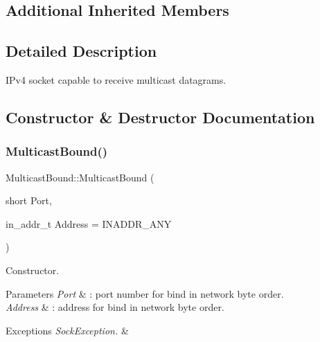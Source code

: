 \subsection*{Additional Inherited Members}


\subsection{Detailed Description}
I\+Pv4 socket capable to receive multicast datagrams. 

\subsection{Constructor \& Destructor Documentation}
\mbox{\label{classMulticastBound_aed105f983bf0ec03ddea66770e2622e7}} 
\subsubsection{\texorpdfstring{Multicast\+Bound()}{MulticastBound()}\hspace{0.1cm}{\footnotesize\ttfamily [1/3]}}
{\footnotesize\ttfamily Multicast\+Bound\+::\+Multicast\+Bound (\begin{DoxyParamCaption}\item[{short}]{Port,  }\item[{in\+\_\+addr\+\_\+t}]{Address = {\ttfamily INADDR\+\_\+ANY} }\end{DoxyParamCaption})}

Constructor. 
\begin{DoxyParams}{Parameters}
{\em Port} & \+: port number for bind in network byte order. \\
\hline
{\em Address} & \+: address for bind in network byte order. \\
\hline
\end{DoxyParams}

\begin{DoxyExceptions}{Exceptions}
{\em Sock\+Exception.} & \\
\hline
\end{DoxyExceptions}
\mbox{\label{classMulticastBound_ae761776cabab795de9070aa631cbe7a7}} 
